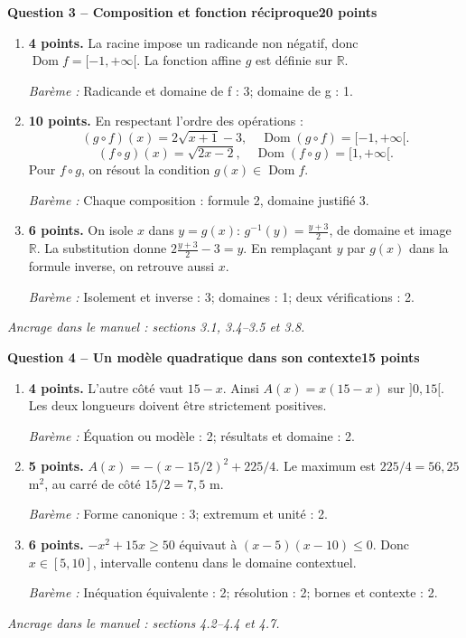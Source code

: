 \documentclass[11pt,a4paper]{article}
\begin{document}
\newpage
{\large\bfseries Question 3 -- Composition et fonction réciproque}\hfill\textbf{20 points}\par
\begin{enumerate}
\item \textbf{4 points.} La racine impose un radicande non négatif, donc \(\operatorname{Dom}f=[-1,+\infty[\). La fonction affine \(g\) est définie sur \(\mathbb R\).
\par{\small\textit{Barème : }Radicande et domaine de f : 3; domaine de g : 1.}
\item \textbf{10 points.} En respectant l’ordre des opérations : \[(g\circ f)(x)=2\sqrt{x+1}-3,\quad \operatorname{Dom}(g\circ f)=[-1,+\infty[.\] \[(f\circ g)(x)=\sqrt{2x-2},\quad \operatorname{Dom}(f\circ g)=[1,+\infty[.\] Pour \(f\circ g\), on résout la condition \(g(x)\in\operatorname{Dom}f\).
\par{\small\textit{Barème : }Chaque composition : formule 2, domaine justifié 3.}
\item \textbf{6 points.} On isole \(x\) dans \(y=g(x)\): \(g^{-1}(y)=\frac{y+3}{2}\), de domaine et image \(\mathbb R\). La substitution donne \(2\frac{y+3}{2}-3=y\). En remplaçant \(y\) par \(g(x)\) dans la formule inverse, on retrouve aussi \(x\).
\par{\small\textit{Barème : }Isolement et inverse : 3; domaines : 1; deux vérifications : 2.}
\end{enumerate}
\vfill {\small\textit{Ancrage dans le manuel : sections 3.1, 3.4--3.5 et 3.8.}}

\newpage
{\large\bfseries Question 4 -- Un modèle quadratique dans son contexte}\hfill\textbf{15 points}\par
\begin{enumerate}
\item \textbf{4 points.} L’autre côté vaut \(15-x\). Ainsi \(A(x)=x(15-x)\) sur \(]0,15[\). Les deux longueurs doivent être strictement positives.
\par{\small\textit{Barème : }Équation ou modèle : 2; résultats et domaine : 2.}
\item \textbf{5 points.} \(A(x)=-(x-15/2)^2+225/4\). Le maximum est \(225/4=56{,}25\) m\(^2\), au carré de côté \(15/2=7{,}5\) m.
\par{\small\textit{Barème : }Forme canonique : 3; extremum et unité : 2.}
\item \textbf{6 points.} \(-x^2+15x\ge50\) équivaut à \((x-5)(x-10)\le0\). Donc \(x\in[5,10]\), intervalle contenu dans le domaine contextuel.
\par{\small\textit{Barème : }Inéquation équivalente : 2; résolution : 2; bornes et contexte : 2.}
\end{enumerate}
\vfill {\small\textit{Ancrage dans le manuel : sections 4.2--4.4 et 4.7.}}
\end{document}
